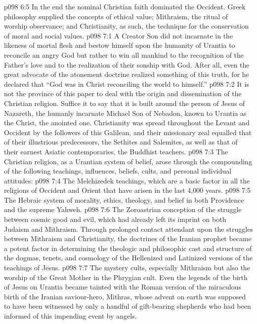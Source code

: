 \vs p098 6:5 \pc In the end the nominal Christian faith dominated the Occident. Greek philosophy supplied the concepts of ethical value; Mithraism, the ritual of worship observance; and Christianity, as such, the technique for the conservation of moral and social values.
\vs p098 7:1 A Creator Son did not incarnate in the likeness of mortal flesh and bestow himself upon the humanity of Urantia to reconcile an angry God but rather to win all mankind to the recognition of the Father’s love and to the realization of their sonship with God. After all, even the great advocate of the atonement doctrine realized something of this truth, for he declared that “God was in Christ reconciling the world to himself.”
\vs p098 7:2 It is not the province of this paper to deal with the origin and dissemination of the Christian religion. Suffice it to say that it is built around the person of Jesus of Nazareth, the humanly incarnate Michael Son of Nebadon, known to Urantia as the Christ, the anointed one. Christianity was spread throughout the Levant and Occident by the followers of this Galilean, and their missionary zeal equalled that of their illustrious predecessors, the Sethites and Salemites, as well as that of their earnest Asiatic contemporaries, the Buddhist teachers.
\vs p098 7:3 The Christian religion, as a Urantian system of belief, arose through the compounding of the following teachings, influences, beliefs, cults, and personal individual attitudes:
\vs p098 7:4 \bibnobreakspace The Melchizedek teachings, which are a basic factor in all the religions of Occident and Orient that have arisen in the last 4,000 years.
\vs p098 7:5 \bibnobreakspace The Hebraic system of morality, ethics, theology, and belief in both Providence and the supreme Yahweh.
\vs p098 7:6 \bibnobreakspace The Zoroastrian conception of the struggle between cosmic good and evil, which had already left its imprint on both Judaism and Mithraism. Through prolonged contact attendant upon the struggles between Mithraism and Christianity, the doctrines of the Iranian prophet became a potent factor in determining the theologic and philosophic cast and structure of the dogmas, tenets, and cosmology of the Hellenized and Latinized versions of the teachings of Jesus.
\vs p098 7:7 \bibnobreakspace The mystery cults, especially Mithraism but also the worship of the Great Mother in the Phrygian cult. Even the legends of the birth of Jesus on Urantia became tainted with the Roman version of the miraculous birth of the Iranian saviour\hyp{}hero, Mithras, whose advent on earth was supposed to have been witnessed by only a handful of gift\hyp{}bearing shepherds who had been informed of this impending event by angels.
